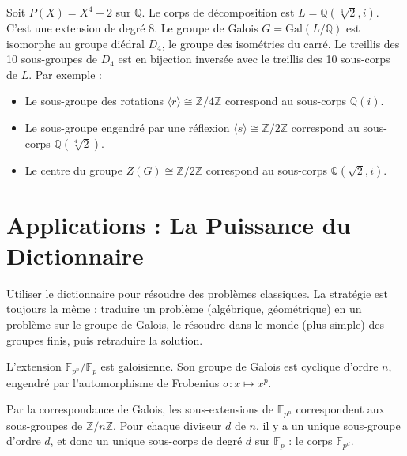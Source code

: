 \begin{example}[La Géométrie de $X^4-2$]
    Soit $P(X)=X^4-2$ sur $\mathbb{Q}$. Le corps de décomposition est $L = \mathbb{Q}(\sqrt[4]{2}, i)$. C'est une extension de degré 8. Le groupe de Galois $G = \mathrm{Gal}(L/\mathbb{Q})$ est isomorphe au groupe diédral $D_4$, le groupe des isométries du carré.
    Le treillis des 10 sous-groupes de $D_4$ est en bijection inversée avec le treillis des 10 sous-corps de $L$. Par exemple :
    \begin{itemize}
        \item Le sous-groupe des rotations $\langle r \rangle \cong \mathbb{Z}/4\mathbb{Z}$ correspond au sous-corps $\mathbb{Q}(i)$.
        \item Le sous-groupe engendré par une réflexion $\langle s \rangle \cong \mathbb{Z}/2\mathbb{Z}$ correspond au sous-corps $\mathbb{Q}(\sqrt[4]{2})$.
        \item Le centre du groupe $Z(G) \cong \mathbb{Z}/2\mathbb{Z}$ correspond au sous-corps $\mathbb{Q}(\sqrt{2}, i)$.
    \end{itemize}
\end{example}

\section{Applications : La Puissance du Dictionnaire}

\begin{objectif}
    Utiliser le dictionnaire pour résoudre des problèmes classiques. La stratégie est toujours la même : traduire un problème (algébrique, géométrique) en un problème sur le groupe de Galois, le résoudre dans le monde (plus simple) des groupes finis, puis retraduire la solution.
\end{objectif}

\begin{theorem}
    L'extension $\mathbb{F}_{p^n}/\mathbb{F}_p$ est galoisienne. Son groupe de Galois est cyclique d'ordre $n$, engendré par l'automorphisme de Frobenius $\sigma: x \mapsto x^p$.
\end{theorem}

\begin{corollary}
    Par la correspondance de Galois, les sous-extensions de $\mathbb{F}_{p^n}$ correspondent aux sous-groupes de $\mathbb{Z}/n\mathbb{Z}$. Pour chaque diviseur $d$ de $n$, il y a un unique sous-groupe d'ordre $d$, et donc un unique sous-corps de degré $d$ sur $\mathbb{F}_p$ : le corps $\mathbb{F}_{p^d}$.
\end{corollary}

